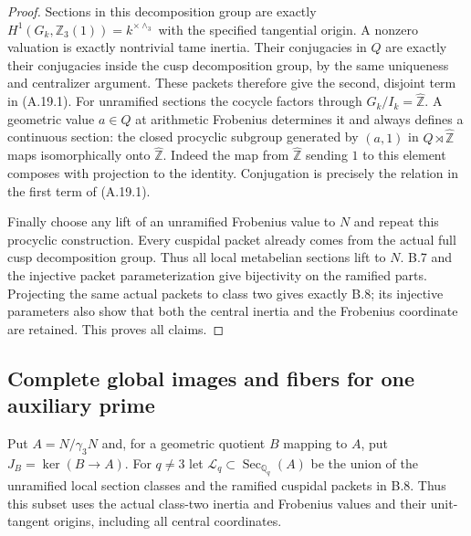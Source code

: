 \begin{proof}
Sections in this decomposition group are exactly
$H^1(G_k,\mathbb Z_3(1))=k^{\times\wedge_3}$ with
the specified tangential origin. A nonzero valuation
is exactly nontrivial tame inertia. Their conjugacies
in $Q$ are exactly their conjugacies inside the cusp
decomposition group, by the same uniqueness and
centralizer argument. These packets therefore give
the second, disjoint term in (A.19.1).
For unramified sections the cocycle factors through
$G_k/I_k=\widehat{\mathbb Z}$. A geometric value
$a\in Q$ at arithmetic Frobenius determines it and
always defines a continuous section: the closed
procyclic subgroup generated by $(a,1)$ in
$Q\rtimes\widehat{\mathbb Z}$ maps isomorphically
onto $\widehat{\mathbb Z}$. Indeed the map from
$\widehat{\mathbb Z}$ sending $1$ to this element
composes with projection to the identity. Conjugation
is precisely the relation in the first term of
(A.19.1).

Finally choose any lift of an unramified Frobenius
value to $N$ and repeat this procyclic construction.
Every cuspidal packet already comes from the actual
full cusp decomposition group. Thus all local
metabelian sections lift to $N$. B.7 and the injective
packet parameterization give bijectivity on the
ramified parts. Projecting the same actual packets to
class two gives exactly B.8; its injective parameters
also show that both the central inertia and the
Frobenius coordinate are retained. This proves all
claims.
\end{proof}

\subsection{Complete global images and fibers for one auxiliary prime}

Put $A=N/\gamma_3N$ and, for a geometric quotient $B$ mapping
to $A$, put $J_B=\ker(B\to A)$. For $q\ne3$ let
$\mathscr L_q\subset\operatorname{Sec}_{\mathbb Q_q}(A)$
be the union of the unramified local section classes and
the ramified cuspidal packets in B.8. Thus this subset uses
the actual class-two inertia and Frobenius values and their
unit-tangent origins, including all central coordinates.

